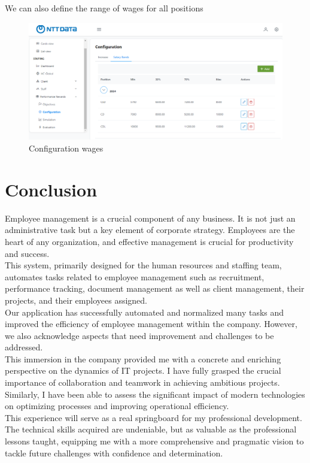 \documentclass[12pt,a4paper,table,english]{article}
\begin{document}
	We can also define the range of wages for all positions
	\begin{figure}[H]
	\centering
	\includegraphics[width=150mm]{Image/confband}
	\caption{Configuration wages}
	\label{fig:Configuration wages}
	\end{figure}


	\newpage
	\section{Conclusion}

	Employee management is a crucial component of any business. It is not just an administrative task but a key element of corporate strategy. Employees are the heart of any organization, and effective management is crucial for productivity and success. \\
	This system, primarily designed for the human resources and staffing team, automates tasks related to employee management such as recruitment, performance tracking, document management as well as client management, their projects, and their employees assigned.\\
	
	Our application has successfully automated and normalized many tasks and improved the efficiency of employee management within the company. However, we also acknowledge aspects that need improvement and challenges to be addressed.\\
	
	This immersion in the company provided me with a concrete and enriching perspective on the dynamics of IT projects. I have fully grasped the crucial importance of collaboration and teamwork in achieving ambitious projects. Similarly, I have been able to assess the significant impact of modern technologies on optimizing processes and improving operational efficiency.\\
	
	This experience will serve as a real springboard for my professional development. The technical skills acquired are undeniable, but as valuable as the professional lessons taught, equipping me with a more comprehensive and pragmatic vision to tackle future challenges with confidence and determination.
	

	\newpage
	
	
	\newpage
	

%	
\end{document}
